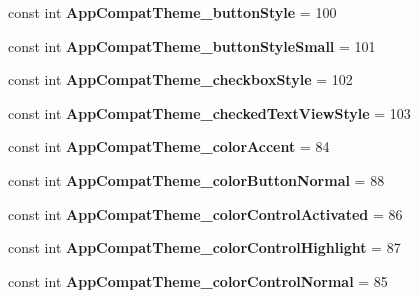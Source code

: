 \begin{DoxyCompactItemize}
const int {\bfseries App\+Compat\+Theme\+\_\+button\+Style} = 100
\item 
\mbox{\label{class_sample_app_1_1_droid_1_1_resource_1_1_styleable_aba6d68da2b1921c988190e118dc8e37c}} 
const int {\bfseries App\+Compat\+Theme\+\_\+button\+Style\+Small} = 101
\item 
\mbox{\label{class_sample_app_1_1_droid_1_1_resource_1_1_styleable_af883e8dfcca4c483cc53fb58e7e6dced}} 
const int {\bfseries App\+Compat\+Theme\+\_\+checkbox\+Style} = 102
\item 
\mbox{\label{class_sample_app_1_1_droid_1_1_resource_1_1_styleable_a927c2fca5cb569e737f1276c2e1f44ee}} 
const int {\bfseries App\+Compat\+Theme\+\_\+checked\+Text\+View\+Style} = 103
\item 
\mbox{\label{class_sample_app_1_1_droid_1_1_resource_1_1_styleable_a562e016771d238d587d7da741f7a9db3}} 
const int {\bfseries App\+Compat\+Theme\+\_\+color\+Accent} = 84
\item 
\mbox{\label{class_sample_app_1_1_droid_1_1_resource_1_1_styleable_a92927116767460d08b2c49cbb342aa89}} 
const int {\bfseries App\+Compat\+Theme\+\_\+color\+Button\+Normal} = 88
\item 
\mbox{\label{class_sample_app_1_1_droid_1_1_resource_1_1_styleable_abf38439e372a1a820e592779ee38dc6d}} 
const int {\bfseries App\+Compat\+Theme\+\_\+color\+Control\+Activated} = 86
\item 
\mbox{\label{class_sample_app_1_1_droid_1_1_resource_1_1_styleable_ab8889ca4aac14089a5725789df520190}} 
const int {\bfseries App\+Compat\+Theme\+\_\+color\+Control\+Highlight} = 87
\item 
\mbox{\label{class_sample_app_1_1_droid_1_1_resource_1_1_styleable_a698184061d526b56db9528fa3876b3c0}} 
const int {\bfseries App\+Compat\+Theme\+\_\+color\+Control\+Normal} = 85

\end{DoxyCompactItemize}

